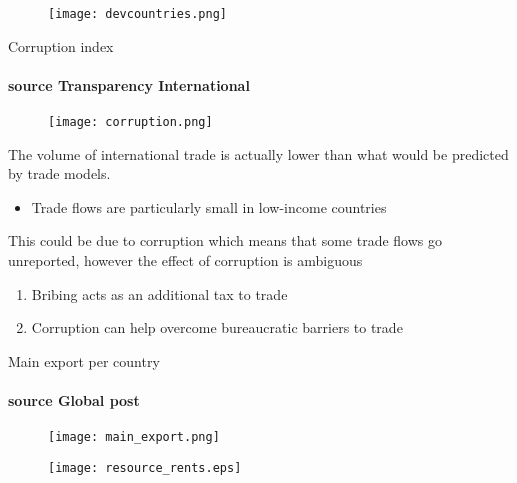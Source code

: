 \documentclass{beamer}
\begin{document}
\begin{frame}
 \begin{figure}
   \texttt{[image: devcountries.png]}
 \end{figure}
\end{frame}

\begin{frame}{Corruption index}\framesubtitle{source Transparency International}
  \begin{figure}
    \texttt{[image: corruption.png]}
  \end{figure}
\end{frame}

\begin{frame}
 The volume of international trade is actually lower than what would be predicted by trade models. 
 \begin{itemize}
   \item Trade flows are particularly small in low-income countries
 \end{itemize}
 \medskip
 This could be due to corruption which means that some trade flows go unreported, however the effect of corruption is ambiguous
 \begin{enumerate}
   \item Bribing acts as an additional tax to trade
   \item Corruption can help overcome bureaucratic barriers to trade
 \end{enumerate}
\end{frame}

\begin{frame}{Main export per country}\framesubtitle{source Global post}
  \begin{figure}
    \texttt{[image: main\_export.png]}
  \end{figure}
\end{frame}



\begin{frame}
  \begin{figure}
    \texttt{[image: resource\_rents.eps]}
  \end{figure}
\end{frame}
\end{document}
